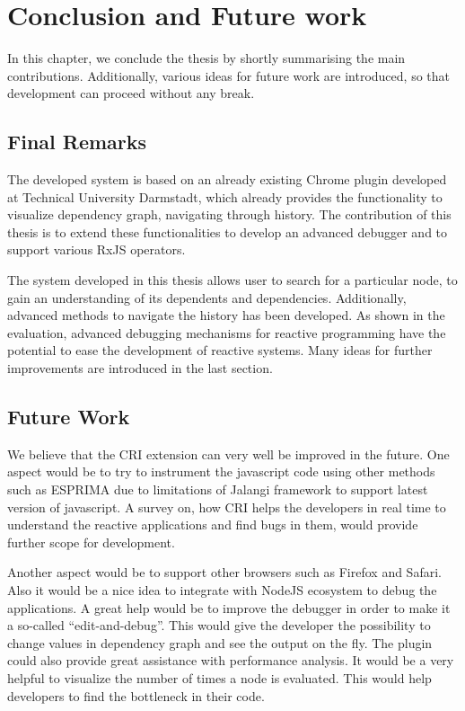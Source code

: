 \chapter{Conclusion and Future work} \label{chap:Summary}
In this chapter, we conclude the thesis by shortly summarising the main contributions. Additionally, various ideas for future work are introduced, so that development can proceed without any break. 

\section{Final Remarks}
The developed system is based on an already existing Chrome plugin developed at Technical University Darmstadt, which already provides the functionality to visualize dependency graph, navigating through history. The contribution of this thesis is to extend these functionalities to develop an advanced debugger and to support various RxJS operators.

The system developed in this thesis allows user to search for a particular node, to gain an understanding of its dependents and dependencies. Additionally, advanced methods to navigate the history has been developed. As shown in the evaluation, advanced debugging mechanisms for reactive programming have the potential to ease the development of reactive systems. Many ideas for further improvements are introduced in the last section.

\section{Future Work}
We believe that the CRI extension can very well be improved in the future. One aspect would be to try to instrument the javascript code using other methods such as ESPRIMA\cite{esprima} due to limitations of Jalangi framework to support latest version of javascript. A survey on, how CRI helps the developers in real time to understand the reactive applications and find bugs in them, would provide further scope for development. 

Another aspect would be to support other browsers such as Firefox and Safari. Also it would be a nice idea to integrate with NodeJS\cite{nodejs} ecosystem to debug the applications. A great help would be to improve the debugger in order to make it a so-called ``edit-and-debug''. This would give the developer the possibility to change values in dependency graph and see the output on the fly. The plugin could also provide great assistance with performance analysis. It would be a very helpful to visualize the number of times a node is evaluated. This would help developers to find the bottleneck in their code. 